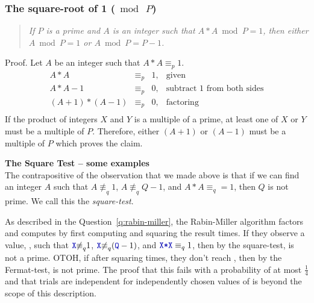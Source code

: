 \documentclass{article}
\newcommand{\equivp}{\equiv_p}
\newcommand{\equivq}{\equiv_q}
\newcommand{\nequivq}{{\not\equiv}_q}
\begin{document}
\subsubsection{The square-root of 1 ($\bmod~P$)}\label{sec:sqrt}
  \begin{quote}\it
    If $P$ is a prime and $A$ is an integer such that $A*A \bmod P = 1$,
    then either $A \bmod P = 1$ or $A \bmod P = P-1$.
  \end{quote}
  Proof.  Let $A$ be an integer such that $A*A \equivp 1$.
  \begin{displaymath}\begin{array}{rcll}
    A*A &\equivp& 1, & \textrm{given}\\
    A*A - 1 &\equivp& 0, & \textrm{subtract 1 from both sides}\\
    (A+1)*(A-1) &\equivp& 0, & \textrm{factoring}\\
  \end{array}\end{displaymath}
  If the product of integers $X$ and $Y$ is a multiple of a prime, at least one of
  $X$ or $Y$ must be a multiple of $P$.  Therefore, either $(A+1)$ or $(A-1)$ must be
  a multiple of $P$ which proves the claim.
  \par\noindent%
  \textbf{The Square Test -- some examples}\\
  The contrapositive of the observation that we made above is that if we can
  find an integer $A$ such that $A \nequivq 1$, $A \nequivq Q-1$, and $A*A \equivq = 1$,
  then $Q$ is not prime.  We call this the \emph{square-test}.

  As described in the Question~\ref{q:rabin-miller}, the Rabin-Miller algorithm factors
   and computes  by first computing
   and squaring the result  times.  If they observe a value, ,
  such that $\code{X} \nequivq  1$, $\code{X} \nequivq (\code{Q}-1)$, and  $\code{X*X} \equivq 1$,
  then by the square-test,  is not a prime.
  OTOH, if after squaring  times, they don't reach , then by the Fermat-test,
   is not prime.
  The proof that this fails with a probability of at most $\frac{1}{4}$ and that trials are
  independent for independently chosen values of  is beyond the scope of this description.
\end{document}
